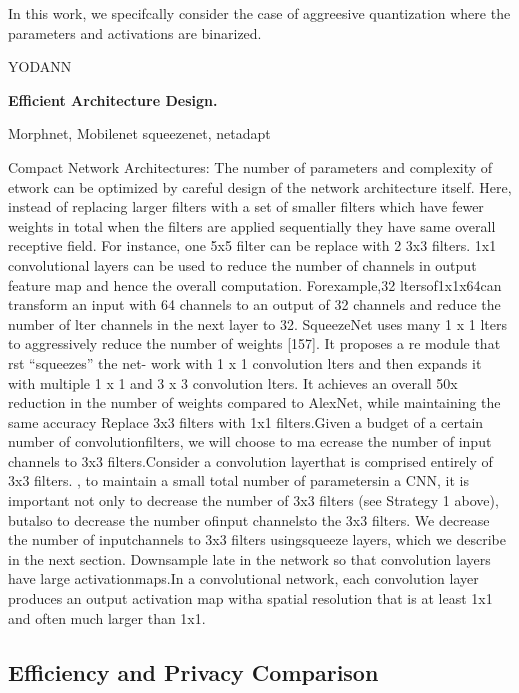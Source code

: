 In this work, we specifcally consider the case of aggreesive quantization where the parameters and activations are binarized.

YODANN

\noindent\textbf{Efficient Architecture Design.}

Morphnet, Mobilenet squeezenet, netadapt

Compact Network Architectures: The number of parameters and complexity of etwork can be optimized by careful design of the network architecture itself.
Here, instead of replacing larger filters with a set of smaller filters which have fewer weights in total when the filters are applied sequentially they have same overall receptive field.
For instance, one 5x5 filter can be replace with 2 3x3 filters. 1x1 convolutional layers can be used to reduce the number of channels in output feature map and hence the overall computation.
Forexample,32 ltersof1x1x64can transform an input with 64 channels to an output of 32 channels and reduce the number of  lter channels in the next layer to 32. SqueezeNet uses many 1 x 1  lters to aggressively reduce the number of weights [157]. It proposes a  re module that  rst “squeezes” the net- work with 1 x 1 convolution  lters and then expands it with multiple 1 x 1 and 3 x 3 convolution  lters.
It achieves an overall 50x reduction in the number of weights compared to AlexNet, while maintaining the same accuracy
Replace 3x3 filters with 1x1 filters.Given a budget of a certain number of convolutionfilters,  we will choose to ma
ecrease the number of input channels to 3x3 filters.Consider a convolution layerthat is comprised entirely of 3x3 filters. , to maintain a small total number of parametersin a CNN, it is important not only to decrease the number of 3x3 filters (see Strategy 1 above), butalso to decrease the number ofinput channelsto the 3x3 filters.  We decrease the number of inputchannels to 3x3 filters usingsqueeze layers, which we describe in the next section.
Downsample late in the network so that convolution layers have large activationmaps.In a convolutional network, each convolution layer produces an output activation map witha spatial resolution that is at least 1x1 and often much larger than 1x1.


\subsection{Efficiency and Privacy Comparison}

